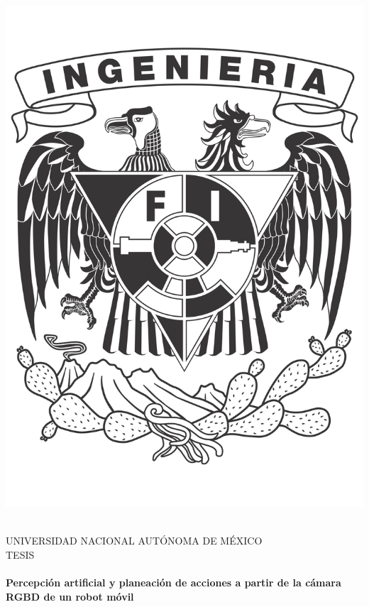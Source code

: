 \begin{center}
\begin{minipage}{0.48\textwidth}
\begin{flushright}
\includegraphics[scale = 0.23]{Figures/Ing_Logo.png}
\end{flushright}\end{minipage}
\vspace*{0.4cm}\\
\textsc{\LARGE UNIVERSIDAD NACIONAL AUTÓNOMA DE MÉXICO}\\[1cm]	
\textsc{\Large TESIS}\\
\vspace*{0.4cm}						
\HRule \\[0.4cm]
{\LARGE \bfseries Percepción artificial y planeación de acciones a partir de la cámara RGBD de un robot móvil }
\\[0.2cm]


\end{center}
